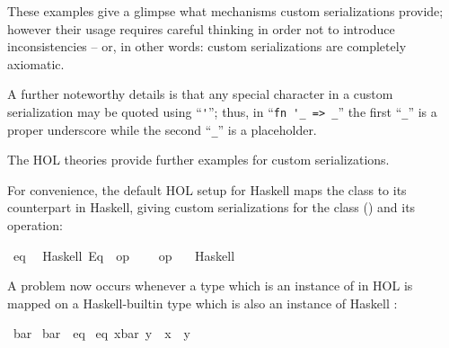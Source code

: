 \begin{isabellebody}
\begin{isamarkuptext}
  These examples give a glimpse what mechanisms
  custom serializations provide; however their usage
  requires careful thinking in order not to introduce
  inconsistencies -- or, in other words:
  custom serializations are completely axiomatic.

  A further noteworthy details is that any special
  character in a custom serialization may be quoted
  using ``\verb|'|''; thus, in
  ``\verb|fn '_ => _|'' the first
  ``\verb|_|'' is a proper underscore while the
  second ``\verb|_|'' is a placeholder.

  The HOL theories provide further
  examples for custom serializations.%
\end{isamarkuptext}%
\isamarkuptrue%
%
\isamarkuptrue%
%
\begin{isamarkuptext}%
For convenience, the default
  HOL setup for Haskell maps the  class to
  its counterpart in Haskell, giving custom serializations
  for the class (\isa{{\isasymCODECLASS}}) and its operation:%
\end{isamarkuptext}%
\isamarkuptrue%
%
\isadelimtt
%
\endisadelimtt
%
\isatagtt
{}\isamarkupfalse%
\ eq\isanewline
\ \ {\isacharparenleft}Haskell\ {\isachardoublequoteopen}Eq{\isachardoublequoteclose}\ \ {\isachardoublequoteopen}op\ {\isacharequal}{\isachardoublequoteclose}\ {\isasymequiv}\ {\isachardoublequoteopen}{\isacharparenleft}{\isacharequal}{\isacharequal}{\isacharparenright}{\isachardoublequoteclose}{\isacharparenright}\isanewline
\isanewline
{}\isamarkupfalse%
\ {\isachardoublequoteopen}op\ {\isacharequal}{\isachardoublequoteclose}\isanewline
\ \ {\isacharparenleft}Haskell\ \ {}\ {\isachardoublequoteopen}{\isacharequal}{\isacharequal}{\isachardoublequoteclose}{\isacharparenright}%
\endisatagtt
{\isafoldtt}%
%
\isadelimtt
%
\endisadelimtt
%
\begin{isamarkuptext}%
A problem now occurs whenever a type which
  is an instance of  in HOL is mapped
  on a Haskell-builtin type which is also an instance
  of Haskell :%
\end{isamarkuptext}%
\isamarkuptrue%
\isamarkupfalse%
\ bar\isanewline
\isanewline
{}\isamarkupfalse%
\ bar\ {\isacharcolon}{\isacharcolon}\ eq\isanewline
{}\isanewline
\isanewline
{}\isamarkupfalse%
\ {\isachardoublequoteopen}eq\ {\isacharparenleft}x{\isasymColon}bar{\isacharparenright}\ y\ {\isasymlongleftrightarrow}\ x\ {\isacharequal}\ y{\isachardoublequoteclose}\isanewline

\end{isabellebody}

